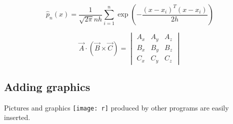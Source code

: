 \documentclass[a4paper, 12pt]{article}
\begin{document}
\begin{equation} %
  \hat{p}_n(x) = \frac{1}{\sqrt{2\pi}nh}\sum_{i=1}^n\exp(-\frac{(x-x_i)^T(x-x_i)}{2h})
\end{equation}


\begin{equation}
\vec{A}\cdot(\vec{B}\times\vec{C})=
\begin{vmatrix}
A_x & A_y & A_z \\
B_x & B_y & B_z \\
C_x & C_y & C_z
\end{vmatrix}
\end{equation}
%
%
\subsection{Adding graphics}
Pictures and graphics
\texttt{[image: r]}
produced by other programs are easily inserted.
\end{document}
